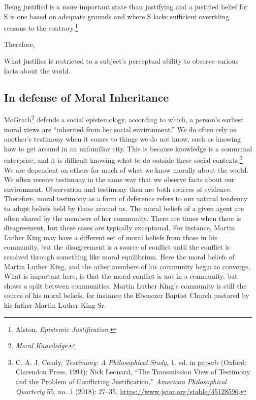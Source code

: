 \documentclass[phdthesis,12pt,final]{wuthesis}
\theoremstyle{definition}
\theoremstyle{definition}
\theoremstyle{definition}
\theoremstyle{definition}
\theoremstyle{remark}
\begin{document}
Being justified is a more important state than justifying and a justified belief for S is one based on adequate grounds and where S lacks sufficient overriding reasons to the contrary.\footnote{Alston, \emph{Epistemic Justification}.}

Therefore,

What justifies is restricted to a subject's perceptual ability to observe various facts about the world.

\subsection*{In defense of Moral Inheritance}\label{in-defense-of-moral-inheritance}

McGrath\footnote{\emph{Moral {Knowledge}}.} defends a social epistemology, according to which, a person's earliest moral views are ``inherited from her social environment.'' We do often rely on another's testimony when it comes to things we do not know, such as knowing how to get around in an unfamiliar city. This is because knowledge is a communal enterprise, and it is difficult knowing what to do outside these social contexts.\footnote{C. A. J. Coady, \emph{Testimony: A Philosophical Study}, 1. ed. in paperb (Oxford: Clarendon Press, 1994); Nick Leonard, {``The {Transmission View} of {Testimony} and the {Problem} of {Conflicting Justification},''} \emph{American Philosophical Quarterly} 55, no. 1 (2018): 27--35, \url{https://www.jstor.org/stable/45128596}.} We are dependent on others for much of what we know morally about the world. We often receive testimony in the same way that we observe facts about our environment. Observation and testimony then are both sources of evidence. Therefore, moral testimony as a form of deference refers to our natural tendency to adopt beliefs held by those around us. The moral beliefs of a given agent are often shared by the members of her community. There are times when there is disagreement, but these cases are typically exceptional. For instance, Martin Luther King may have a different set of moral beliefs from those in his community, but the disagreement is a source of conflict until the conflict is resolved through something like moral equilibrium. Here the moral beliefs of Martin Luther King, and the other members of his community begin to converge. What is important here, is that the moral conflict is not in a community, but shows a split between communities. Martin Luther King's community is still the source of his moral beliefs, for instance the Ebenezer Baptist Church pastored by his father Martin Luther King Sr.
\end{document}
